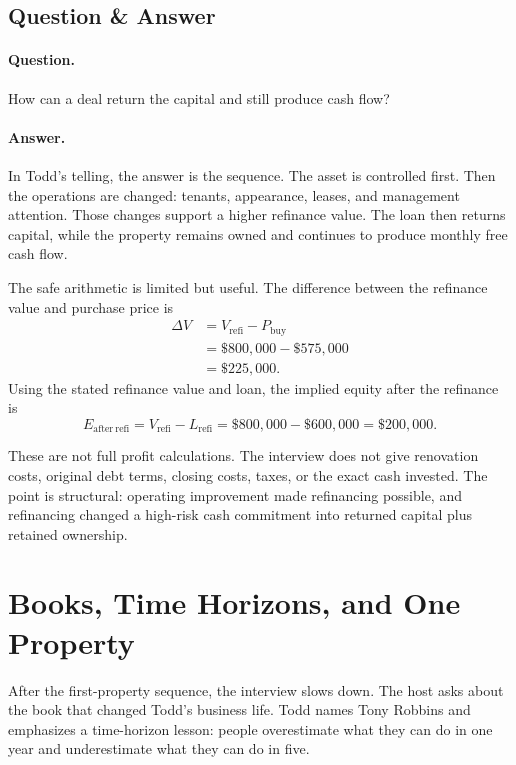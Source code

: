 \subsection{Question \& Answer}

\paragraph{Question.}
How can a deal return the capital and still produce cash flow?

\paragraph{Answer.}
In Todd's telling, the answer is the sequence. The asset is controlled first. Then the operations are changed: tenants, appearance, leases, and management attention. Those changes support a higher refinance value. The loan then returns capital, while the property remains owned and continues to produce monthly free cash flow.

The safe arithmetic is limited but useful. The difference between the refinance value and purchase price is
\begin{align}
\Delta V
&=
V_{\mathrm{refi}}-P_{\mathrm{buy}} \\
&=
\$800{,}000-\$575{,}000 \\
&=
\$225{,}000.
\end{align}
Using the stated refinance value and loan, the implied equity after the refinance is
\begin{equation}
E_{\mathrm{after\ refi}}
=
V_{\mathrm{refi}}-L_{\mathrm{refi}}
=
\$800{,}000-\$600{,}000
=
\$200{,}000.
\end{equation}

These are not full profit calculations. The interview does not give renovation costs, original debt terms, closing costs, taxes, or the exact cash invested. The point is structural: operating improvement made refinancing possible, and refinancing changed a high-risk cash commitment into returned capital plus retained ownership.

\section{Books, Time Horizons, and One Property}

After the first-property sequence, the interview slows down. The host asks about the book that changed Todd's business life. Todd names Tony Robbins and emphasizes a time-horizon lesson: people overestimate what they can do in one year and underestimate what they can do in five.

